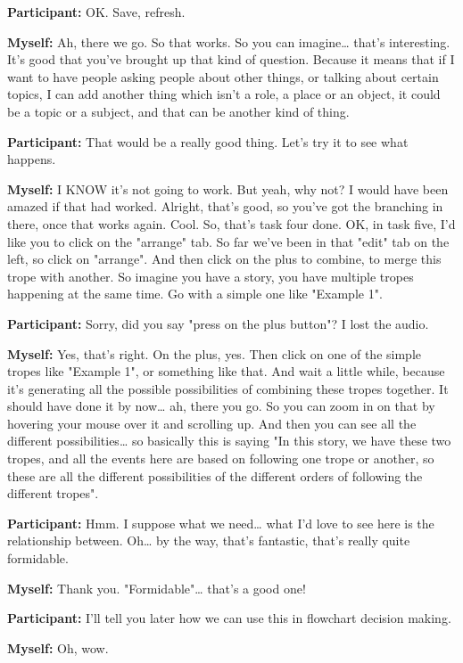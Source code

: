 \documentclass[11pt]{report}
\begin{document}
\begin{linenumbers}
\textbf{Participant:} OK. Save, refresh.

\textbf{Myself:} Ah, there we go. So that works. So you can imagine\ldots{} that's interesting. It's good that you've brought up that kind of question. Because it means that if I want to have people asking people about other things, or talking about certain topics, I can add another thing which isn't a role, a place or an object, it could be a topic or a subject, and that can be another kind of thing.

\textbf{Participant:} That would be a really good thing. Let's try it to see what happens.

\textbf{Myself:} I KNOW it's not going to work. But yeah, why not? I would have been amazed if that had worked. Alright, that's good, so you've got the branching in there, once that works again. Cool. So, that's task four done. OK, in task five, I'd like you to click on the "arrange" tab. So far we've been in that "edit" tab on the left, so click on "arrange". And then click on the plus to combine, to merge this trope with another. So imagine you have a story, you have multiple tropes happening at the same time. Go with a simple one like "Example 1".

\textbf{Participant:} Sorry, did you say "press on the plus button"? I lost the audio.

\textbf{Myself:} Yes, that's right. On the plus, yes. Then click on one of the simple tropes like "Example 1", or something like that. And wait a little while, because it's generating all the possible possibilities of combining these tropes together. It should have done it by now\ldots{} ah, there you go. So you can zoom in on that by hovering your mouse over it and scrolling up. And then you can see all the different possibilities\ldots{} so basically this is saying "In this story, we have these two tropes, and all the events here are based on following one trope or another, so these are all the different possibilities of the different orders of following the different tropes".

\textbf{Participant:} Hmm. I suppose what we need\ldots{} what I'd love to see here is the relationship between. Oh\ldots{} by the way, that's fantastic, that's really quite formidable.

\textbf{Myself:} Thank you. "Formidable"\ldots{} that's a good one!

\textbf{Participant:} I'll tell you later how we can use this in flowchart decision making.

\textbf{Myself:} Oh, wow.


\end{linenumbers}
\end{document}
